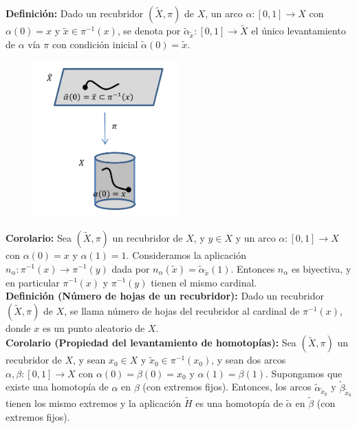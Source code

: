 \documentclass{article}
\begin{document}
\textbf{Definición:} Dado un recubridor $(\tilde{X},\pi)$ de $X$, un arco $\alpha:[0,1]\rightarrow X$ con $\alpha(0)=x$ y $\tilde{x}\in \pi^{-1}(x)$, se denota por $\tilde{\alpha}_{\tilde{x}}:[0,1]\rightarrow \tilde{X}$ el único levantamiento de $\alpha$ vía $\pi$ con condición inicial $\tilde{\alpha}(0)=\tilde{x}$.\\

\begin{figure}[h]
\centering
\includegraphics[scale=1,width=6.cm, height=6cm]{levantamientoarco.png}
\end{figure}

\textbf{Corolario:} Sea $(\tilde{X},\pi)$ un recubridor de $X$, y $y\in X$ y un arco $\alpha:[0,1]\rightarrow X$ con $\alpha(0)=x$ y $\alpha(1)=1$. Consideramos la aplicación $n_\alpha:\pi^{-1}(x)\rightarrow \pi^{-1}(y)$ dada por $n_\alpha(\tilde{x})=\tilde{\alpha}_{\tilde{x}}(1)$. Entonces $n_\alpha$ es biyectiva, y en particular $\pi^{-1}(x)$ y $\pi^{-1}(y)$ tienen el mismo cardinal.\\

\textbf{Definición (Número de hojas de un recubridor):} Dado un recubridor $(\tilde{X},\pi)$ de $X$, se llama número de hojas del recubridor al cardinal de $\pi^{-1}(x)$, donde $x$ es un punto aleatorio de $X$.\\

\textbf{Corolario (Propiedad del levantamiento de homotopías):} Sea $(\tilde{X},\pi)$ un recubridor de $X$, y sean $x_0\in X$ y $\tilde{x}_0\in \pi^{-1}(x_0)$, y sean dos arcos $\alpha,\beta:[0,1]\rightarrow X$ con $\alpha(0)=\beta(0)=x_0$ y $\alpha(1)=\beta(1)$. Supongamos que existe una homotopía de $\alpha$ en $\beta$ (con extremos fijos). Entonces, los arcos $\tilde{\alpha}_{\tilde{x}_0}$ y $\tilde{\beta}_{\tilde{x}_0}$ tienen los mismo extremos y la aplicación $\tilde{H}$ es una homotopía de $\tilde{\alpha}$ en $\tilde{\beta}$ (con extremos fijos).\\
\end{document}
